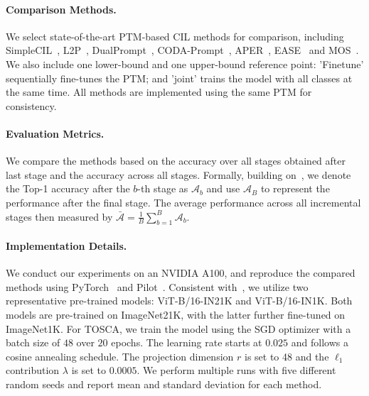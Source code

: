 \paragraph{Comparison Methods.}
We select state-of-the-art PTM-based CIL methods for comparison, including SimpleCIL~\cite{simplecil_aper}, L2P~\cite{l2p}, DualPrompt~\cite{dualprompt}, CODA-Prompt~\cite{codaprompt}, APER~\cite{simplecil_aper}, EASE~\cite{ease} and MOS~\cite{mos}. We also include one lower-bound and one upper-bound reference point: 'Finetune' sequentially fine-tunes the PTM; and 'joint' trains the model with all classes at the same time. All methods are implemented using the same PTM for consistency.

\paragraph{Evaluation Metrics.}
We compare the methods based on the accuracy over all stages obtained after last stage and the accuracy across all stages. Formally, building on~\cite{icarl}, we denote the Top-1 accuracy after the $b$-th stage as $\mathcal{A}_b$ and use $\mathcal{A}_B$ to represent the performance after the final stage. The average performance across all incremental stages then measured by $\bar{\mathcal{A}} = \frac{1}{B} \sum_{b=1}^B\mathcal{A}_b$.

\paragraph{Implementation Details.}
We conduct our experiments on an NVIDIA A100, and reproduce the compared methods using PyTorch~\cite{pytorch} and Pilot~\cite{pilot}. Consistent with~\cite{simplecil_aper, ease, mos}, we utilize two representative pre-trained models: ViT-B/16-IN21K and ViT-B/16-IN1K. Both models are pre-trained on ImageNet21K, with the latter further fine-tuned on ImageNet1K.
For TOSCA, we train the model using the SGD optimizer with a batch size of $48$ over $20$ epochs. The learning rate starts at $0.025$ and follows a cosine annealing schedule. The projection dimension $r$ is set to 48 and the $\ell_1$ contribution $\lambda$ is set to $0.0005$.  
We perform multiple runs with five different random seeds and report mean and standard deviation for each method.

